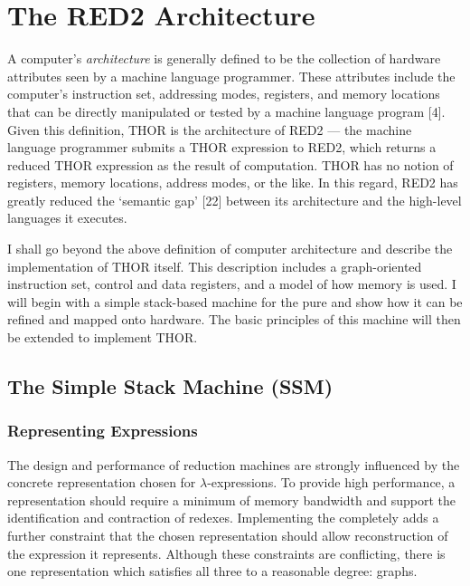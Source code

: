 \chapter{The RED2 Architecture}


A computer's \emph{architecture} is generally defined to be the collection of hardware attributes seen by a machine language programmer. These attributes include the computer's instruction set, addressing modes, registers, and memory locations that can be directly manipulated or tested by a machine language program [4]. Given this definition, THOR is the architecture of RED2 --- the machine language programmer submits a THOR expression to RED2, which returns a reduced THOR expression as the result of computation. THOR has no notion of registers, memory locations, address modes, or the like. In this regard, RED2 has greatly reduced the `semantic gap' [22] between its architecture and the high-level languages it executes.

I shall go beyond the above definition of computer architecture and describe the implementation of THOR itself. This description includes a graph-oriented instruction set, control and data registers, and a model of how memory is used. I will begin with a simple stack-based machine for the pure \lambdacalculus{} and show how it can be refined and mapped onto hardware. The basic principles of this machine will then be extended to implement THOR.

\section{The Simple Stack Machine (SSM)}

\subsection{Representing Expressions}

The design and performance of reduction machines are strongly influenced by the concrete representation chosen for \(\lambda\)-expressions. To provide high performance, a representation should require a minimum of memory bandwidth and support the identification and contraction of redexes. Implementing the \lambdabetacalculus{} completely adds a further constraint that the chosen representation should allow reconstruction of the expression it represents. Although these constraints are conflicting, there is one representation which satisfies all three to a reasonable degree: graphs.


